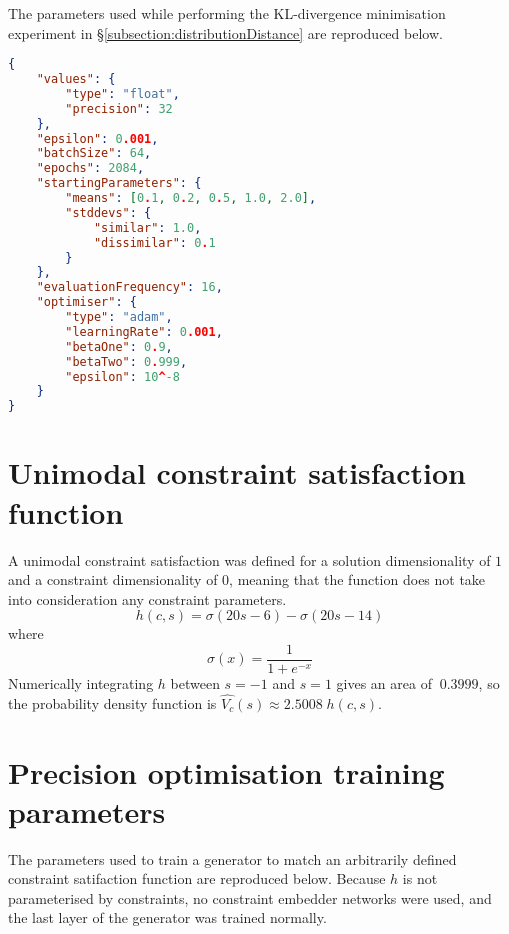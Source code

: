 \documentclass[../main.tex]{subfiles}
\begin{document}
The parameters used while performing the KL-divergence minimisation experiment in \S\ref{subsection:distributionDistance} are reproduced below.

\begin{lstlisting}[language=json,firstnumber=1,caption={Experimental parameters for minimising the KL-divergence of two distributions.},captionpos=b]
{
    "values": {
        "type": "float",
        "precision": 32
    },
    "epsilon": 0.001,
    "batchSize": 64,
    "epochs": 2084,
    "startingParameters": {
        "means": [0.1, 0.2, 0.5, 1.0, 2.0],
        "stddevs": {
            "similar": 1.0,
            "dissimilar": 0.1
        }
    },
    "evaluationFrequency": 16,
    "optimiser": {
        "type": "adam",
        "learningRate": 0.001,
        "betaOne": 0.9,
        "betaTwo": 0.999,
        "epsilon": 10^-8
    }
}
\end{lstlisting}

\section{Unimodal constraint satisfaction function} \label{appendix:unimodalCSF}

A unimodal constraint satisfaction was defined for a solution dimensionality of $1$ and a constraint dimensionality of $0$, meaning that the function does not take into consideration any constraint parameters.
\begin{equation}
    h(c,s)=\sigma(20s-6)-\sigma(20s-14)
\end{equation}
where
\begin{equation}
    \sigma(x)=\frac{1}{1+e^{-x}}
\end{equation}
Numerically integrating $h$ between $s=-1$ and $s=1$ gives an area of $~0.3999$, so the probability density function is $\hat{V_c}(s)\approx2.5008\;h(c,s)$.

\section{Precision optimisation training parameters} \label{appendix:precisionOptimisationTrainingParameters}

The parameters used to train a generator to match an arbitrarily defined constraint satifaction function are reproduced below.
Because $h$ is not parameterised by constraints, no constraint embedder networks were used, and the last layer of the generator was trained normally.
\end{document}
